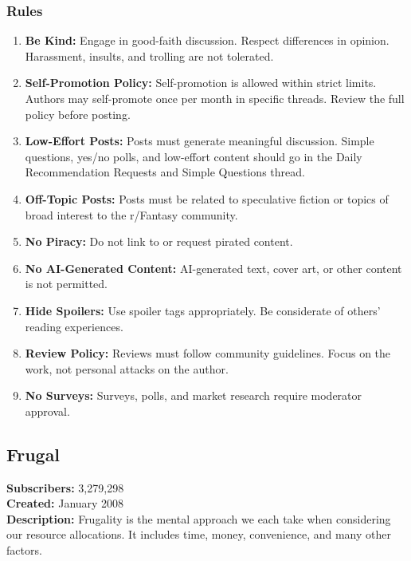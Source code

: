 \subsubsection{Rules}
\begin{enumerate}
    \item \textbf{Be Kind:} Engage in good-faith discussion. Respect differences in opinion. Harassment, insults, and trolling are not tolerated.
    
    \item \textbf{Self-Promotion Policy:} Self-promotion is allowed within strict limits. Authors may self-promote once per month in specific threads. Review the full policy before posting.
    
    \item \textbf{Low-Effort Posts:} Posts must generate meaningful discussion. Simple questions, yes/no polls, and low-effort content should go in the Daily Recommendation Requests and Simple Questions thread.
    
    \item \textbf{Off-Topic Posts:} Posts must be related to speculative fiction or topics of broad interest to the r/Fantasy community.
    
    \item \textbf{No Piracy:} Do not link to or request pirated content.
    
    \item \textbf{No AI-Generated Content:} AI-generated text, cover art, or other content is not permitted.
    
    \item \textbf{Hide Spoilers:} Use spoiler tags appropriately. Be considerate of others' reading experiences.
    
    \item \textbf{Review Policy:} Reviews must follow community guidelines. Focus on the work, not personal attacks on the author.
    
    \item \textbf{No Surveys:} Surveys, polls, and market research require moderator approval.
\end{enumerate}

\subsection{Frugal}
\textbf{Subscribers:} 3,279,298 \\
\textbf{Created:} January 2008 \\
\textbf{Description:} Frugality is the mental approach we each take when considering our resource allocations. It includes time, money, convenience, and many other factors.

